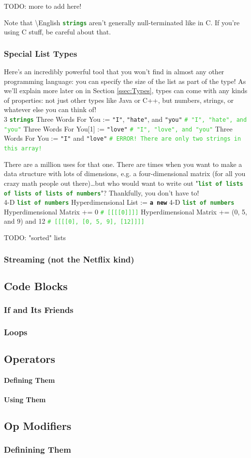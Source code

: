 \documentclass{article}
\newcommand{\name}{\textbackslash{}English}				%
\newcommand{\ssecl}[1]{\subsection{#1}\label{ssec:#1}}
\newcommand{\sssecl}[1]{\subsubsection{#1}\label{sssec:#1}}
\newcommand{\codecomment}[1]{\texttt{\textcolor{LimeGreen}{#1}}}
\newcommand{\commentline}[1]{\codecomment{\# #1}}
\newcommand{\type}[1]{\texttt{\textcolor{ForestGreen}{\textbf{#1}}}}
\newcommand{\common}[1]{\texttt{\textcolor{Mulberry}{\textbf{#1}}}}
\newcommand{\codestring}[1]{\texttt{\textcolor{NavyBlue}{"#1"}}}
\newenvironment{code}[0]
{\ttfamily{}				%
\setlength\parindent{0cm}	%
~\\}
{\setlength\parindent{1cm}
~\\}
\begin{document}
TODO: more to add here!

\indent Note that \name{} \type{strings} aren't generally null-terminated like in C. If you're using C stuff, be careful about that.

\sssecl{Special List Types}
\indent Here's an incredibly powerful tool that you won't find in almost any other programming language: you can specify the size of the list as part of the type! As we'll explain more later on in Section \ref{ssec:Types}, types can come with any kinds of properties: not just other types like Java or C++, but numbers, strings, or whatever else you can think of!
\begin{code}
3 \type{strings} Three Words For You := \codestring{I}, \codestring{hate}, and \codestring{you}	\commentline{"I", "hate", and "you"}
Three Words For You[1] := \codestring{love}	\commentline{"I", "love", and "you"}
Three Words For You := \codestring{I} and \codestring{love}	\commentline{ERROR! There are only two strings in this array!}
\end{code}

\indent There are a million uses for that one.
\indent There are times when you want to make a data structure with lots of dimensions, e.g. a four-dimensional matrix (for all you crazy math people out there)\ldots{}but who would want to write out "\type{list of lists of lists of lists of numbers}"? Thankfully, you don't have to!
\begin{code}
4-D \type{list of numbers} Hyperdimensional List := \common{a new} 4-D \type{list of numbers}
Hyperdimensional Matrix += 0	\commentline{[[[[0]]]]}
Hyperdimensional Matrix += (0, 5, and 9) and 12	\commentline{[[[[0], [0, 5, 9], [12]]]]}
\end{code}

\indent TODO: "sorted" lists

\sssecl{Streaming (not the Netflix kind)}

\ssecl{Code Blocks}
\sssecl{If and Its Friends}

\sssecl{Loops}

\ssecl{Operators}
\paragraph{Defining Them}

\paragraph{Using Them}

\ssecl{Op Modifiers}
\sssecl{Definining Them}
\end{document}
